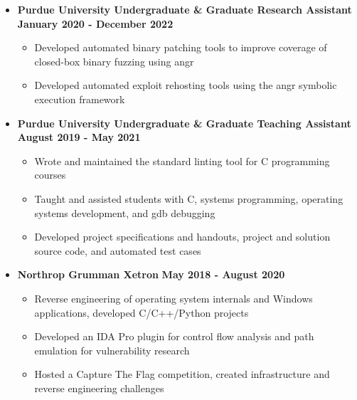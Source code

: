 \documentclass[letterpaper,10pt]{article}
\begin{document}
\begin{flushleft}
\begin{itemize}
\begin{itemize}
            \end{itemize}
        \item \textbf{Purdue University Undergraduate \& Graduate Research Assistant} \hfill \textbf{January 2020 - December 2022} \\
            \begin{itemize}
                \item Developed automated binary patching tools to improve coverage of closed-box binary fuzzing using angr \\
                \item Developed automated exploit rehosting tools using the angr symbolic execution framework \\
            \end{itemize}
        \item \textbf{Purdue University Undergraduate \& Graduate Teaching Assistant} \hfill \textbf{August 2019 - May 2021} \\
            \begin{itemize}
                \item Wrote and maintained the standard linting tool for C programming courses \\
                \item Taught and assisted students with C, systems programming, operating systems development, and gdb debugging \\
                \item Developed project specifications and handouts, project and solution source code, and automated test cases \\
            \end{itemize}
    		\item \textbf{Northrop Grumman Xetron} \hfill \textbf{May 2018 - August 2020} \\
    			\begin{itemize}
                \item Reverse engineering of operating system internals and Windows applications, developed C/C++/Python projects \\
                \item Developed an IDA Pro plugin for control flow analysis and path emulation for vulnerability research \\
                \item Hosted a Capture The Flag competition, created infrastructure and reverse engineering challenges \\

\end{itemize}
\end{itemize}
\end{flushleft}
\end{document}
